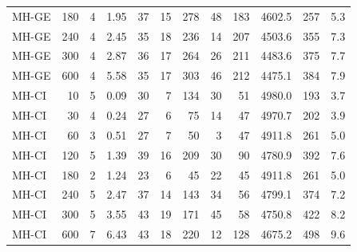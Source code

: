 \begin{table}[b]
\begin{tabular}{lrrr|rr|rrr|rrr}
MH-GE & 180 & 4 & 1.95 & 37 & 15 & 278 & 48 & 183 & 4602.5 & 257 & 5.3 \\
MH-GE & 240 & 4 & 2.45 & 35 & 18 & 236 & 14 & 207 & 4503.6 & 355 & 7.3 \\
MH-GE & 300 & 4 & 2.87 & 36 & 17 & 264 & 26 & 211 & 4483.6 & 375 & 7.7 \\
MH-GE & 600 & 4 & 5.58 & 35 & 17 & 303 & 46 & 212 & 4475.1 & 384 & 7.9 \\
MH-CI & 10 & 5 & 0.09 & 30 &  7 & 134 & 30 & 51 & 4980.0 & 193 & 3.7 \\
MH-CI & 30 & 4 & 0.24 & 27 &  6 &  75 & 14 & 47 & 4970.7 & 202 & 3.9 \\
MH-CI & 60 & 3 & 0.51 & 27 &  7 &  50 & 3 & 47 & 4911.8 & 261 & 5.0 \\
MH-CI & 120 & 5 & 1.39 & 39 & 16 & 209 & 30 & 90 & 4780.9 & 392 & 7.6 \\
MH-CI & 180 & 2 & 1.24 & 23 &  6 &  45 & 22 & 45 & 4911.8 & 261 & 5.0 \\
MH-CI & 240 & 5 & 2.47 & 37 & 14 & 143 & 34 & 56 & 4799.1 & 374 & 7.2 \\
MH-CI & 300 & 5 & 3.55 & 43 & 19 & 171 & 45 & 58 & 4750.8 & 422 & 8.2 \\
MH-CI & 600 & 7 & 6.43 & 43 & 18 & 220 & 12 & 128 & 4675.2 & 498 & 9.6 \\
\bottomrule
\end{tabular}
\end{table}

